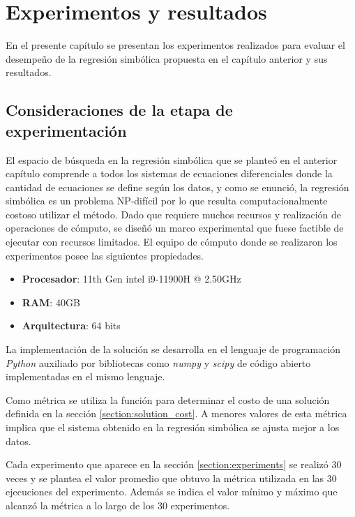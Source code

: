 \chapter{Experimentos y resultados}\label{chapter:results}

En el presente capítulo se presentan los experimentos realizados para evaluar el desempeño de la regresión simbólica propuesta en el capítulo anterior y sus resultados.

\section{Consideraciones de la etapa de experimentación}\label{section:experimental_considerations}

El espacio de búsqueda en la regresión simbólica que se planteó en el anterior capítulo comprende a todos los sistemas de ecuaciones diferenciales donde la cantidad de ecuaciones se define según los datos, y como se enunció, la regresión simbólica es un problema NP-difícil por lo que resulta computacionalmente costoso utilizar el método. Dado que requiere muchos recursos y realización de operaciones de cómputo, se diseñó un marco experimental que fuese factible de ejecutar con recursos limitados. El equipo de cómputo donde se realizaron los experimentos posee las siguientes propiedades.


\begin{itemize}
    \item \textbf{Procesador}: 11th Gen intel i9-11900H @ 2.50GHz
    \item \textbf{RAM}: 40GB
    \item \textbf{Arquitectura}: 64 bits
\end{itemize}

La implementación de la solución se desarrolla en el lenguaje de programación \emph{Python} auxiliado por bibliotecas como \emph{numpy} y \emph{scipy} de código abierto implementadas en el mismo lenguaje.

Como métrica se utiliza la función para determinar el costo de una solución definida en la sección \ref{section:solution_cost}. A menores valores de esta métrica implica que el sistema obtenido en la regresión simbólica se ajusta mejor a los datos.

Cada experimento que aparece en la sección \ref{section:experiments} se realizó 30 veces y se plantea el valor promedio que obtuvo la métrica utilizada en las 30 ejecuciones del experimento. Además se indica el valor mínimo y máximo que alcanzó la métrica a lo largo de los 30 experimentos.

